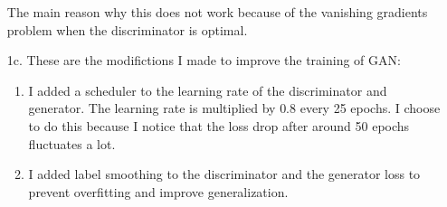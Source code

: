 \documentclass[a4paper]{article}
\theoremstyle{definition}
\newenvironment{soln}{
	\leavevmode\color{blue}\ignorespaces
}{}
\begin{document}
\begin{soln}
\begin{itemize}
			The main reason why this does not work because of the vanishing gradients problem when the discriminator is optimal.
			
			\item[1c.] 
			These are the modifictions I made to improve the training of GAN:
			\begin{enumerate}
				\item I added a scheduler to the learning rate of the discriminator and generator. The learning rate is multiplied by $0.8$ every 25 epochs. I choose to do this because I notice that the loss drop after around 50 epochs fluctuates a lot.
				\item I added label smoothing to the discriminator and the generator loss to prevent overfitting and improve generalization.
			\end{enumerate}
			

\end{itemize}
\end{soln}
\end{document}
